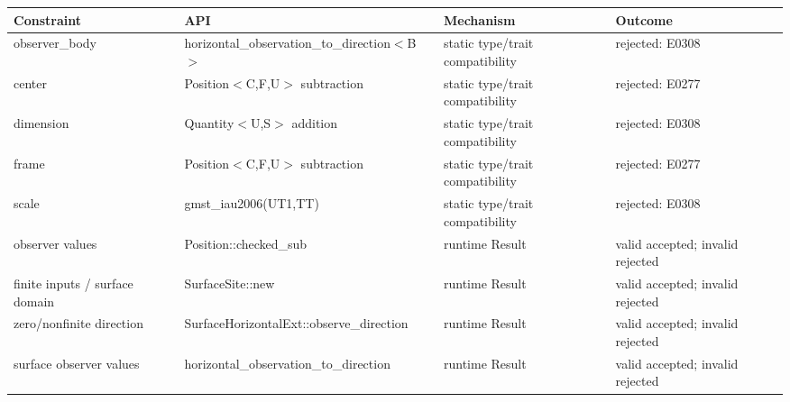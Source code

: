 \begin{tabularx}{\textwidth}{@{}YYYY@{}}
    \toprule
    Constraint                     & API                                                                                  & Mechanism                       & Outcome                          \\
    \midrule
    observer\_\allowbreak{}body    & horizontal\_\allowbreak{}observation\_\allowbreak{}to\_\allowbreak{}direction$<$B$>$ & static type/trait compatibility & rejected: E0308                  \\
    center                         & Position$<$C,F,U$>$ subtraction                                                      & static type/trait compatibility & rejected: E0277                  \\
    dimension                      & Quantity$<$U,S$>$ addition                                                           & static type/trait compatibility & rejected: E0308                  \\
    frame                          & Position$<$C,F,U$>$ subtraction                                                      & static type/trait compatibility & rejected: E0277                  \\
    scale                          & gmst\_\allowbreak{}iau2006(UT1,TT)                                                   & static type/trait compatibility & rejected: E0308                  \\
    observer values                & Position::checked\_\allowbreak{}sub                                                  & runtime Result                  & valid accepted; invalid rejected \\
    finite inputs / surface domain & SurfaceSite::new                                                                     & runtime Result                  & valid accepted; invalid rejected \\
    zero/nonfinite direction       & SurfaceHorizontalExt::observe\_\allowbreak{}direction                                & runtime Result                  & valid accepted; invalid rejected \\
    surface observer values        & horizontal\_\allowbreak{}observation\_\allowbreak{}to\_\allowbreak{}direction        & runtime Result                  & valid accepted; invalid rejected \\
    \bottomrule
\end{tabularx}

